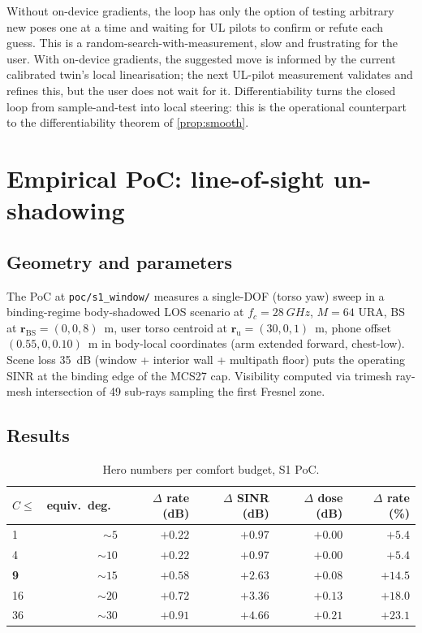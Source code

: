 \documentclass[11pt,a4paper]{article}
\theoremstyle{definition}
\newcommand{\rr}{\mathbf{r}}
\begin{document}
Without on-device gradients, the loop has only the option of
testing arbitrary new poses one at a time and waiting for UL
pilots to confirm or refute each guess.  This is a
random-search-with-measurement, slow and frustrating for the user.
With on-device gradients, the suggested move is informed by the
current calibrated twin's local linearisation; the next UL-pilot
measurement validates and refines this, but the user does not wait
for it.  Differentiability turns the closed loop from
sample-and-test into local steering: this is the operational
counterpart to the differentiability theorem of
\cref{prop:smooth}.

\section{Empirical PoC: line-of-sight un-shadowing}\label{sec:eval-poc}

\subsection{Geometry and parameters}

The PoC at \texttt{poc/s1\_window/} measures a single-DOF (torso
yaw) sweep in a binding-regime body-shadowed LOS scenario at
$f_c=\SI{28}{GHz}$, $M=64$ URA, BS at $\rr_{\mathrm{BS}}=(0,0,8)$~m,
user torso centroid at $\rr_{\mathrm{u}}=(30,0,1)$~m, phone offset
$(0.55,0,0.10)$~m in body-local coordinates (arm extended forward,
chest-low).  Scene loss \SI{35}{dB} (window + interior wall +
multipath floor) puts the operating SINR at the binding edge of the
MCS27 cap.  Visibility computed via trimesh ray-mesh
intersection of 49 sub-rays sampling the first Fresnel zone.

\subsection{Results}

\begin{table}[h]
\centering\small
\caption{Hero numbers per comfort budget, S1 PoC.}
\label{tab:poc}
\begin{tabular}{@{}lrrrrr@{}}
\toprule
$C\le$ & equiv.\ deg.\ & $\Delta$ rate (dB) & $\Delta$ SINR (dB)
       & $\Delta$ dose (dB) & $\Delta$ rate (\%) \\
\midrule
1   & $\sim 5$  & $+0.22$ & $+0.97$ & $+0.00$ & $+5.4$ \\
4   & $\sim 10$ & $+0.22$ & $+0.97$ & $+0.00$ & $+5.4$ \\
\textbf{9}   & \textbf{$\sim 15$} & \textbf{$+0.58$} & \textbf{$+2.63$}
            & \textbf{$+0.08$} & \textbf{$+14.5$} \\
16  & $\sim 20$ & $+0.72$ & $+3.36$ & $+0.13$ & $+18.0$ \\
36  & $\sim 30$ & $+0.91$ & $+4.66$ & $+0.21$ & $+23.1$ \\
\bottomrule
\end{tabular}
\end{table}
\end{document}
